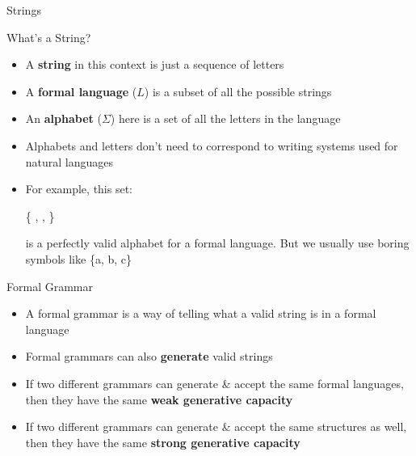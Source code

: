 \documentclass{beamer}
\begin{document}
\begin{frame}{Strings}
\begin{block}{What's a String?}
\begin{itemize}
	\item A \textbf{string} in this context is just a sequence of letters
	\pause
	\item A \textbf{formal language} ($L$) is a subset of all the possible strings
	\pause
	\item An \textbf{alphabet} ($\Sigma$) here is a set of all the letters in the language
	\pause
	\item Alphabets and letters don't need to correspond to writing systems used for natural languages
	\pause
	\item For example, this set:\\
	\begin{center}
	{\LARGE \{ \Smiley[][cyan], \Springtree, \Snowman \}}\\
	\end{center}
	is a perfectly valid alphabet for a formal language. \pause But we usually use boring symbols like \{a, b, c\}
\end{itemize}
\end{block}
\end{frame}


\begin{frame}{Formal Grammar}
\begin{block}{}
\begin{itemize}
	\item A formal grammar is a way of telling what a valid string is in a formal language
	\item Formal grammars can also \textbf{generate} valid strings
	\pause
	\item If two different grammars can generate \& accept the same formal languages, then they have the same \textbf{weak generative capacity}
	\pause
	\item If two different grammars can generate \& accept the same structures as well, then they have the same \textbf{strong generative capacity}
\end{itemize}
\end{block}
\end{frame}
\end{document}
